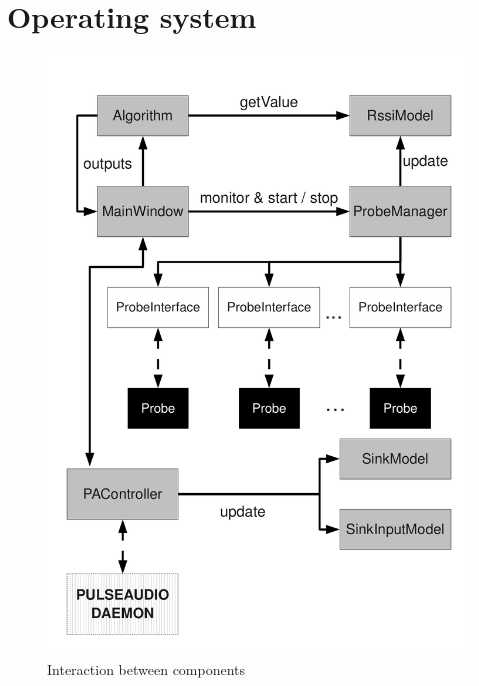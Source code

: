\documentclass[conference]{IEEEtran}
\begin{document}


\section{Operating system}

\begin{figure}
\centering
\includegraphics[scale=0.3]{architettura}
\caption{Interaction between components}
\label{arch}
\end{figure}
\end{document}
